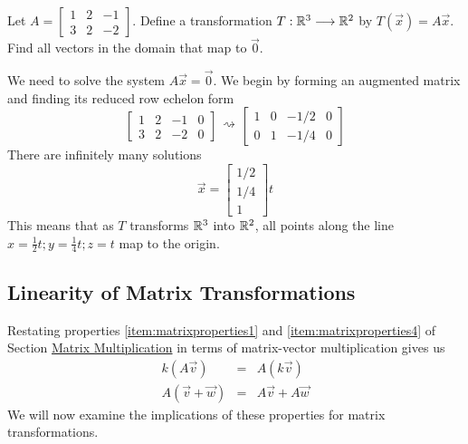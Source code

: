 \documentclass{ximera}
\begin{document}
\begin{example}\label{ex:matrixTrans1}
    Let $A=\begin{bmatrix}1&2&-1\\3&2&-2\end{bmatrix}$.  Define a transformation 
    $T:\mathbb{R}^3\longrightarrow\mathbb{R}^2$ by 
    $T(\vec{x})=A\vec{x}$.  Find all vectors in the domain that map to $\vec{0}$.
 \begin{explanation}
    We need to solve the system $A\vec{x}=\vec{0}$.  We begin by forming an augmented matrix and finding its reduced row echelon form
    $$\left[\begin{array}{ccc|c} 
 1&2&-1&0\\3&2&-2&0
 \end{array}\right]\begin{array}{c}
 \\
 \rightsquigarrow\\
 \\
 \end{array}\left[\begin{array}{ccc|c} 
 1&0&-1/2&0\\0&1&-1/4&0
 \end{array}\right]$$
 There are infinitely many solutions
 $$\vec{x}=\begin{bmatrix}1/2\\1/4\\1\end{bmatrix}t$$
 This means that as $T$ transforms $\mathbb{R}^3$ into $\mathbb{R}^2$, all points along the line $x=\frac{1}{2}t; y=\frac{1}{4}t; z=t$ map to the origin.
\end{explanation}    
\end{example}

\subsection*{Linearity of Matrix Transformations}
Restating properties \ref{item:matrixproperties1} and \ref{item:matrixproperties4} of Section \href{https://ximera.osu.edu/oerlinalg/LinearAlgebra/MAT-0020/main}{Matrix Multiplication} in terms of matrix-vector multiplication gives us
\begin{eqnarray}\label{eq:linearityConstant}
 k(A\vec{v})&=&A(k\vec{v})\\
    A(\vec{v}+\vec{w})&=&A\vec{v}+A\vec{w}\label{eq:linearityAdd}
   \end{eqnarray}
We will now examine the implications of these properties for matrix transformations.
\end{document}
